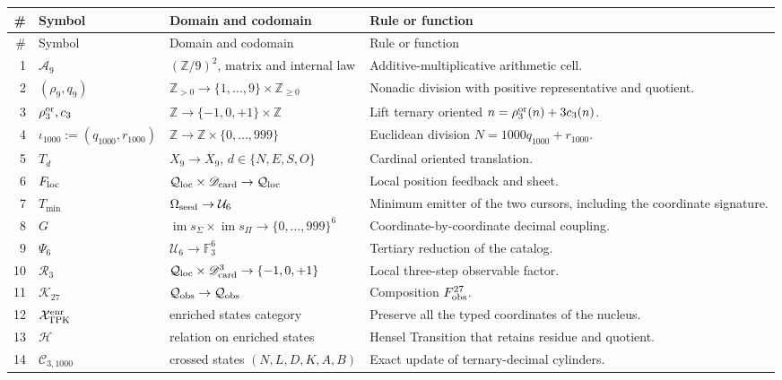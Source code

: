 {\begingroup
\scriptsize
\renewcommand{\arraystretch}{1.12}
\begin{longtable}{@{}r p{}p{}p{}@{}}
\toprule
\#&Symbol&Domain and codomain&Rule or function\\
\midrule
\endfirsthead
\toprule
\#&Symbol&Domain and codomain&Rule or function\\
\midrule
\endhead
1&\(\mathcal A_9\)&\((\mathbb Z/9)^2\), matrix and internal law&
Additive-multiplicative arithmetic cell.\\
2&\((\rho_9,q_9)\)&\(\mathbb Z_{>0}\to
\{1,\ldots,9\}\times\mathbb Z_{\geq0}\)&
Nonadic division with positive representative and quotient.\\
3&\(\rho_3^{\rm or},c_3\)&\(\mathbb Z\to
\{-1,0,+1\}\times\mathbb Z\)&
Lift ternary oriented \(n=\rho_3^{\rm or}(n)+3c_3(n)\).\\
4&\(\iota_{1000}:=(q_{1000},r_{1000})\)&\(\mathbb Z\to
\mathbb Z\times\{0,\ldots,999\}\)&
Euclidean division \(N=1000q_{1000}+r_{1000}\).\\
5&\(T_d\)&\(X_9\to X_9\), \(d\in\{N,E,S,O\}\)&
Cardinal oriented translation.\\
6&\(F_{\rm loc}\)&\(\mathcal Q_{\rm loc}\times
\mathscr D_{\rm card}\to\mathcal Q_{\rm loc}\)&
Local position feedback and sheet.\\
7&\(T_{\min}\)&\(\Omega_{\rm seed}\to\mathcal U_6\)&
Minimum emitter of the two cursors, including the coordinate signature.\\
8&\(G\)&\(\operatorname{im}s_\Sigma\times
\operatorname{im}s_\Pi\to\{0,\ldots,999\}^6\)&
Coordinate-by-coordinate decimal coupling.\\
9&\(\Psi_6\)&\(\mathcal U_6\to\mathbb F_3^6\)&
Tertiary reduction of the catalog.\\
10&\(\mathcal R_3\)&\(\mathcal Q_{\rm loc}\times
\mathscr D_{\rm card}^3\to\{-1,0,+1\}\)&
Local three-step observable factor.\\
11&\(\mathcal K_{27}\)&\(\mathcal Q_{\rm obs}\to\mathcal Q_{\rm obs}\)&
Composition \(F_{\rm obs}^{27}\).\\
12&\(\mathcal X_{\rm TPK}^{\rm enr}\)&enriched states category&
Preserve all the typed coordinates of the nucleus.\\
13&\(\mathcal H\)&relation on enriched states&
Hensel Transition that retains residue and quotient.\\
14&\(\mathcal C_{3,1000}\)&crossed states
\((N,L,D,K,A,B)\)&
Exact update of ternary-decimal cylinders.\\

\end{longtable}}
